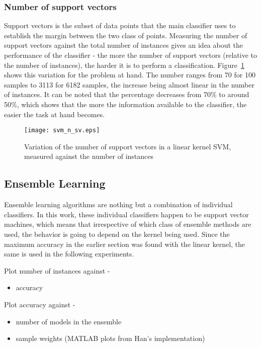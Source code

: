 \subsubsection{Number of support vectors}
Support vectors is the subset of data points that the main classifier uses to establish the margin between the two class of points. Measuring the number of support vectors against the total number of instances gives an idea about the performance of the classifier - the more the number of support vectors (relative to the number of instances), the harder it is to perform a classification. Figure~\ref{svm_n_sv} shows this variation for the problem at hand. The number ranges from 70 for 100 samples to 3113 for 6182 samples, the increase being almost linear in the number of instances. It can be noted that the percentage decreases from 70\% to around 50\%, which shows that the more the information available to the classifier, the easier the task at hand becomes.
\begin{figure}
    \centering
    \texttt{[image: svm\_n\_sv.eps]}
    \caption{Variation of the number of support vectors in a linear kernel SVM, measured against the number of instances}
    \label{svm_n_sv}
\end{figure}

\subsection{Ensemble Learning}
Ensemble learning algorithms are nothing but a combination of individual classifiers. In this work, these individual classifiers happen to be support vector machines, which means that irrespective of which class of ensemble methods are used, the behavior is going to depend on the kernel being used. Since the maximum accuracy in the earlier section was found with the linear kernel, the same is used in the following experiments.

Plot number of instances against -
\begin{itemize}
    \item{accuracy}
\end{itemize}

Plot accuracy against -
\begin{itemize}
    \item{number of models in the ensemble}
    \item{sample weights (MATLAB plots from Han's implementation)}
\end{itemize}

